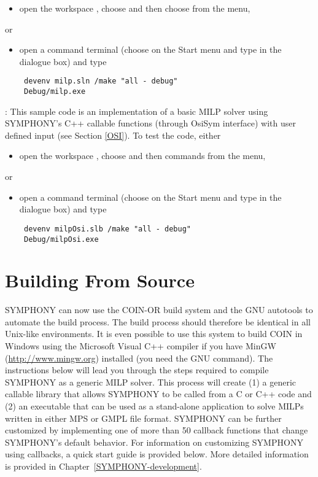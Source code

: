 \begin{itemize}
\begin{itemize}
\item open the workspace , choose 
and then choose  from the  menu, 
\end{itemize}
or
\begin{itemize}
\item open a command terminal (choose  on the Start menu and type
 in the dialogue box) and type 
{\color{Brown}
\begin{verbatim}
 devenv milp.sln /make "all - debug"
 Debug/milp.exe
 \end{verbatim}
}
\end{itemize}
: This sample code is an implementation of a basic MILP 
solver using SYMPHONY's C++ callable functions (through OsiSym interface)
with user defined input (see Section \ref{OSI}). To test the code, either 
\begin{itemize}
\item open the workspace , 
choose  and then 
 commands from the  menu, 
\end{itemize}
or
\begin{itemize}
\item open a command terminal (choose  on the Start menu and type
 in the dialogue box) and type 
{\color{Brown}
\begin{verbatim}
 devenv milpOsi.slb /make "all - debug"
 Debug/milpOsi.exe
 \end{verbatim}
}
\end{itemize}
\end{itemize}



\section{Building From Source} 
\label{building_from_source}

SYMPHONY can now use the COIN-OR build system and the GNU autotools to
automate the build process. The build process should therefore be identical in
all Unix-like environments. It is even possible to use this system to build
COIN in Windows using the Microsoft Visual C++ compiler if you have MinGW
(\url{http://www.mingw.org}) installed (you need the GNU  command).
The instructions below will lead you through the steps required to compile
SYMPHONY as a generic MILP solver. This process will create (1) a generic
callable library that allows SYMPHONY to be called from a C or C++ code and
(2) an executable that can be used as a stand-alone application to solve MILPs
written in either MPS or GMPL file format. SYMPHONY can be further customized
by implementing one of more than 50 callback functions that change SYMPHONY's
default behavior. For information on customizing SYMPHONY using callbacks, a
quick start guide is provided below. More detailed information is provided in
Chapter~\ref{SYMPHONY-development}.

